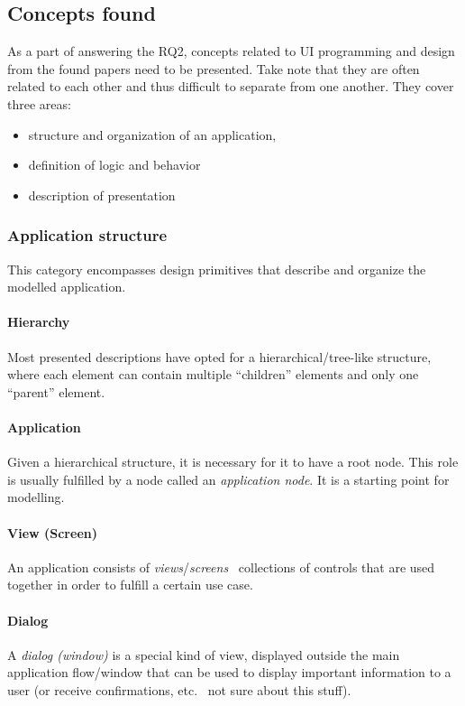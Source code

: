 \subsection{Concepts found}\label{subsec:concepts-found}

As a part of answering the RQ2, concepts related to UI programming and design from the found papers need to be presented.
Take note that they are often related to each other and thus difficult to separate from one another.
They cover three areas:
\begin{itemize}
    \item structure and organization of an application,
    \item definition of logic and behavior
    \item description of presentation
\end{itemize}

\subsubsection{Application structure}
This category encompasses design primitives that describe and organize the modelled application.

\paragraph{Hierarchy}
Most presented descriptions have opted for a hierarchical/tree-like structure, where each element can contain multiple \enquote{children} elements and only one \enquote{parent} element.

\paragraph{Application}
Given a hierarchical structure, it is necessary for it to have a root node.
This role is usually fulfilled by a node called an \emph{application node}.
It is a starting point for modelling.

\paragraph{View (Screen)}
An application consists of \emph{views}/\emph{screens} \textendash\ collections of controls that are used together in order to fulfill a certain use case.

\paragraph{Dialog}
 A \emph{dialog (window)} is a special kind of view, displayed outside the main application flow/window that can be used to display important information to a user (or receive confirmations, etc. \textendash\ not sure about this stuff).

